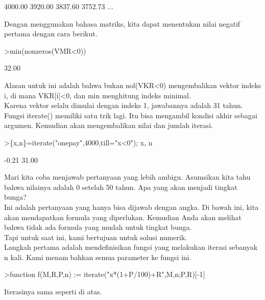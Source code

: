 \documentclass[a4paper,10pt]{article}
\begin{document}
\begin{eulernotebook}
\begin{eulercomment}
\begin{eulercomment}
\begin{eulercomment}
\begin{eulercomment}
\begin{euleroutput}
      4000.00     3920.00     3837.60     3752.73     ...
\end{euleroutput}
\begin{eulercomment}
Dengan menggunakan bahasa matriks, kita dapat menentukan nilai negatif
pertama dengan cara berikut.
\end{eulercomment}
\begin{eulerprompt}
>min(nonzeros(VMR<0))
\end{eulerprompt}
\begin{euleroutput}
        32.00 
\end{euleroutput}
\begin{eulercomment}
Alasan untuk ini adalah bahwa bukan nol(VKR\textless{}0) mengembalikan vektor
indeks i, di mana VKR[i]\textless{}0, dan min menghitung indeks minimal.\\
Karena vektor selalu dimulai dengan indeks 1, jawabannya adalah 31
tahun.\\
Fungsi iterate() memiliki satu trik lagi. Itu bisa mengambil kondisi
akhir sebagai argumen. Kemudian akan mengembalikan nilai dan jumlah
iterasi.
\end{eulercomment}
\begin{eulerprompt}
>\{x,n\}=iterate("onepay",4000,till="x<0"); x, n
\end{eulerprompt}
\begin{euleroutput}
        -0.21 
        31.00 
\end{euleroutput}
\begin{eulercomment}
Mari kita coba menjawab pertanyaan yang lebih ambigu. Asumsikan kita
tahu bahwa nilainya adalah 0 setelah 50 tahun. Apa yang akan menjadi
tingkat bunga?\\
Ini adalah pertanyaan yang hanya bisa dijawab dengan angka. Di bawah
ini, kita akan mendapatkan formula yang diperlukan. Kemudian Anda akan
melihat bahwa tidak ada formula yang mudah untuk tingkat bunga.\\
Tapi untuk saat ini, kami bertujuan untuk solusi numerik.\\
Langkah pertama adalah mendefinisikan fungsi yang melakukan iterasi
sebanyak n kali. Kami menambahkan semua parameter ke fungsi ini.
\end{eulercomment}
\begin{eulerprompt}
>function f(M,R,P,n) := iterate("x*(1+P/100)+R",M,n;P,R)[-1]
\end{eulerprompt}
\begin{eulercomment}
Iterasinya sama seperti di atas.


\end{eulercomment}
\end{eulercomment}
\end{eulercomment}
\end{eulercomment}
\end{eulercomment}
\end{eulernotebook}
\end{document}
